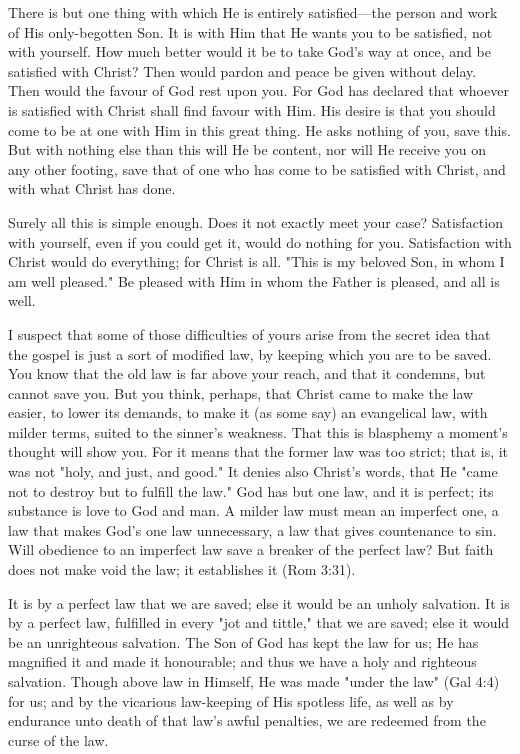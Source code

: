 \documentclass[
]{book}
\begin{document}
There is but one thing with which He is entirely satisfied---the person and work of His only-begotten Son. It is with Him that He wants you to be satisfied, not with yourself. How much better would it be to take God's way at once, and be satisfied with Christ? Then would pardon and peace be given without delay. Then would the favour of God rest upon you. For God has declared that whoever is satisfied with Christ shall find favour with Him. His desire is that you should come to be at one with Him in this great thing. He asks nothing of you, save this. But with nothing else than this will He be content, nor will He receive you on any other footing, save that of one who has come to be satisfied with Christ, and with what Christ has done.

Surely all this is simple enough. Does it not exactly meet your case? Satisfaction with yourself, even if you could get it, would do nothing for you. Satisfaction with Christ would do everything; for Christ is all. "This is my beloved Son, in whom I am well pleased." Be pleased with Him in whom the Father is pleased, and all is well.

I suspect that some of those difficulties of yours arise from the secret idea that the gospel is just a sort of modified law, by keeping which you are to be saved. You know that the old law is far above your reach, and that it condemns, but cannot save you. But you think, perhaps, that Christ came to make the law easier, to lower its demands, to make it (as some say) an evangelical law, with milder terms, suited to the sinner's weakness. That this is blasphemy a moment's thought will show you. For it means that the former law was too strict; that is, it was not "holy, and just, and good." It denies also Christ's words, that He "came not to destroy but to fulfill the law." God has but one law, and it is perfect; its substance is love to God and man. A milder law must mean an imperfect one, a law that makes God's one law unnecessary, a law that gives countenance to sin. Will obedience to an imperfect law save a breaker of the perfect law? But faith does not make void the law; it establishes it (Rom 3:31).

It is by a perfect law that we are saved; else it would be an unholy salvation. It is by a perfect law, fulfilled in every "jot and tittle," that we are saved; else it would be an unrighteous salvation. The Son of God has kept the law for us; He has magnified it and made it honourable; and thus we have a holy and righteous salvation. Though above law in Himself, He was made "under the law" (Gal 4:4) for us; and by the vicarious law-keeping of His spotless life, as well as by endurance unto death of that law's awful penalties, we are redeemed from the curse of the law.
\end{document}
